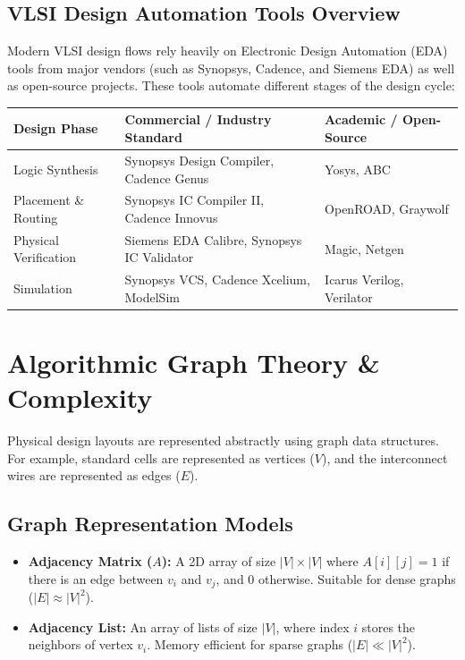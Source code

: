 \documentclass[12pt,a4paper]{article}
\renewcommand{\arraystretch}{1.45}
\begin{document}
\subsection{VLSI Design Automation Tools Overview}
Modern VLSI design flows rely heavily on Electronic Design Automation (EDA) tools from major vendors (such as Synopsys, Cadence, and Siemens EDA) as well as open-source projects. These tools automate different stages of the design cycle:

\par\vspace{6pt}\noindent
{\renewcommand{\arraystretch}{1.35}%
\begin{tabularx}{\linewidth}{|B{3.2cm}|Y|Y|}
\hline
\textbf{Design Phase} & \textbf{Commercial / Industry Standard} & \textbf{Academic / Open-Source} \\
\hline
Logic Synthesis & Synopsys Design Compiler, Cadence Genus & Yosys, ABC \\
\hline
Placement \& Routing & Synopsys IC Compiler II, Cadence Innovus & OpenROAD, Graywolf \\
\hline
Physical Verification & Siemens EDA Calibre, Synopsys IC Validator & Magic, Netgen \\
\hline
Simulation & Synopsys VCS, Cadence Xcelium, ModelSim & Icarus Verilog, Verilator \\
\hline
\end{tabularx}}

\section{Algorithmic Graph Theory \& Complexity}

Physical design layouts are represented abstractly using graph data structures. For example, standard cells are represented as vertices ($V$), and the interconnect wires are represented as edges ($E$).

\subsection{Graph Representation Models}
\begin{itemize}[leftmargin=*, itemsep=2pt]
  \item \textbf{Adjacency Matrix ($A$):} A 2D array of size $|V| \times |V|$ where $A[i][j] = 1$ if there is an edge between $v_i$ and $v_j$, and $0$ otherwise. Suitable for dense graphs ($|E| \approx |V|^2$).
  \item \textbf{Adjacency List:} An array of lists of size $|V|$, where index $i$ stores the neighbors of vertex $v_i$. Memory efficient for sparse graphs ($|E| \ll |V|^2$).
\end{itemize}
\end{document}
